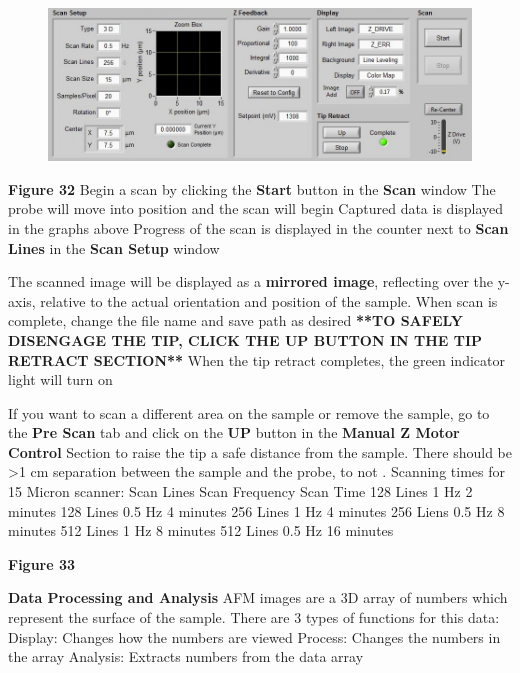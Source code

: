 \documentclass{../lab}
\begin{document}
\textbf{}

\begin{figure}[h]
    \centering
    \href{http://dev-physicsadv.pantheon.berkeley.edu/sites/default/files/AFMImages/toposcansetup.jpg}{\includegraphics[width=0.5\linewidth]{images/toposcansetup.jpg}}
    \caption{}
    \label{fig:toposcansetup}
\end{figure}


\textbf{Figure 32}
Begin a scan by clicking the \textbf{Start} button in the \textbf{Scan} window
The probe will move into position and the scan will begin
Captured data is displayed in the graphs above
Progress of the scan is displayed in the counter next to \textbf{Scan Lines} in the \textbf{Scan Setup} window

The scanned image will be displayed as a \textbf{mirrored image}, reflecting over the y-axis, relative to the actual orientation and position of the sample.
When scan is complete, change the file name and save path as desired
\textbf{**TO SAFELY DISENGAGE THE TIP, CLICK THE UP BUTTON IN THE TIP RETRACT SECTION**}
When the tip retract completes, the green indicator light will turn on

If you want to scan a different area on the sample or remove the sample, go to the \textbf{Pre Scan }tab and click on the \textbf{UP }button in the \textbf{Manual Z Motor Control }Section to raise the tip a safe distance from the sample.  There should be >1 cm separation between the sample and the probe, to not \textbf{}.
Scanning times for 15 Micron scanner:
Scan Lines
Scan Frequency
Scan Time
128 Lines
1 Hz
2 minutes
128 Lines
0.5 Hz
4 minutes
256 Lines
1 Hz
4 minutes
256 Liens
0.5 Hz
8 minutes
512 Lines
1 Hz
8 minutes
512 Lines
0.5 Hz
16 minutes

\textbf{Figure 33}
\textbf{}



\textbf{Data Processing and Analysis}
AFM images are a 3D array of numbers which represent the surface of the sample.  There are 3 types of functions for this data:
Display:  Changes how the numbers are viewed
Process: Changes the numbers in the array
Analysis:  Extracts numbers from the data array
\end{document}
